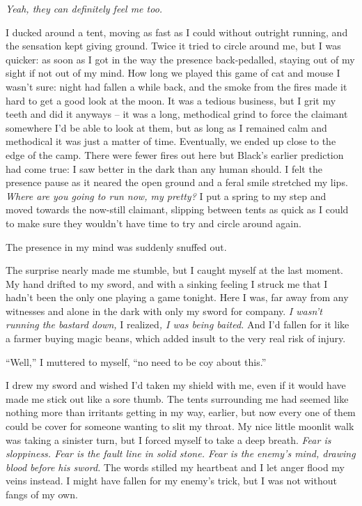 \documentclass[12pt, openany]{book}
\begin{document}
\textit{Yeah, they can definitely feel me too.}

I ducked around a tent, moving as fast as I could without outright running, and the sensation kept giving ground. Twice it tried to circle around me, but I was quicker: as soon as I got in the way the presence back-pedalled, staying out of my sight if not out of my mind. How long we played this game of cat and mouse I wasn’t sure: night had fallen a while back, and the smoke from the fires made it hard to get a good look at the moon. It was a tedious business, but I grit my teeth and did it anyways – it was a long, methodical grind to force the claimant somewhere I’d be able to look at them, but as long as I remained calm and methodical it was just a matter of time. Eventually, we ended up close to the edge of the camp. There were fewer fires out here but Black’s earlier prediction had come true: I saw better in the dark than any human should. I felt the presence pause as it neared the open ground and a feral smile stretched my lips. \textit{Where are you going to run now, my pretty? }I put a spring to my step and moved towards the now-still claimant, slipping between tents as quick as I could to make sure they wouldn’t have time to try and circle around again.

The presence in my mind was suddenly snuffed out.

The surprise nearly made me stumble, but I caught myself at the last moment. My hand drifted to my sword, and with a sinking feeling I struck me that I hadn’t been the only one playing a game tonight. Here I was, far away from any witnesses and alone in the dark with only my sword for company.\textit{ I wasn’t running the bastard down, }I realized\textit{, I was being baited.} And I’d fallen for it like a farmer buying magic beans, which added insult to the very real risk of injury.

“Well,” I muttered to myself, “no need to be coy about this.”

I drew my sword and wished I’d taken my shield with me, even if it would have made me stick out like a sore thumb. The tents surrounding me had seemed like nothing more than irritants getting in my way, earlier, but now every one of them could be cover for someone wanting to slit my throat. My nice little moonlit walk was taking a sinister turn, but I forced myself to take a deep breath. \textit{Fear is sloppiness. Fear is the fault line in solid stone. Fear is the enemy’s mind, drawing blood before his sword. }The words stilled my heartbeat and I let anger flood my veins instead. I might have fallen for my enemy’s trick, but I was not without fangs of my own.
\end{document}
